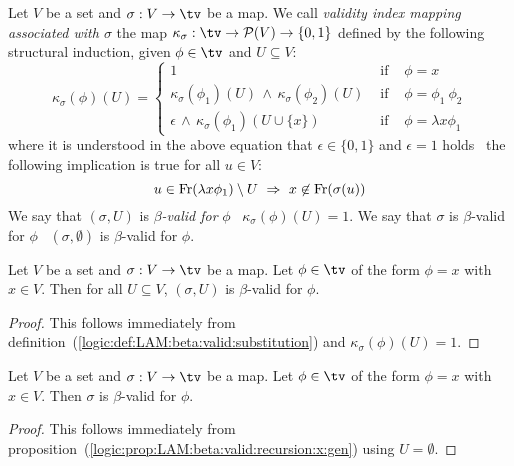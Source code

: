 \begin{defin}\label{logic:def:LAM:beta:valid:substitution}
    Let $V$ be a set and $\sigma:V\to\tv$ be a map. We call {\em validity
    index mapping associated with $\sigma$} the map $\kappa_{\sigma}:\tv
    \to{\cal P}(V)\to\{0,1\}$ defined by the following structural induction,
    given $\phi\in\tv$ and $U\subseteq V$:
        \begin{equation}\label{logic:eqn:LAM:index}
            \kappa_{\sigma}(\phi)(U)=\left\{
                \begin{array}{lcl}
                    1&\mbox{\ if\ }&\phi=x\\
                    \kappa_{\sigma}(\phi_{1})(U)\,\land\,
                    \kappa_{\sigma}(\phi_{2})(U)
                    &\mbox{\ if\ }&\phi=\phi_{1}\ \phi_{2}\\
                    \epsilon\,\land\,\kappa_{\sigma}(\phi_{1})(U\cup\{x\})
                    &\mbox{\ if\ }&\phi=\lambda x\phi_{1}
            \end{array}\right.
        \end{equation} 
    where it is understood in the above equation that $\epsilon\in\{0,1\}$ 
    and $\epsilon=1$ holds \ifand\ the following implication is true 
    for all $u\in V$:
        \[
            u\in\free(\lambda x\phi_{1})\setminus U
                \ \Rightarrow\ 
            x\not\in\free(\sigma(u))
        \]
    We say that $(\sigma,U)$ is {\em $\beta$-valid for} $\phi$ \ifand\ 
    $\kappa_{\sigma}(\phi)(U)=1$. \newline
    We say that $\sigma$ is $\beta$-valid for $\phi$ \ifand\
    $(\sigma,\emptyset)$ is $\beta$-valid for $\phi$.
\end{defin}

\begin{prop}\label{logic:prop:LAM:beta:valid:recursion:x:gen}
    Let $V$ be a set and $\sigma:V\to\tv$ be a map. Let $\phi\in\tv$
    of the form $\phi=x$ with $x\in V$. Then for all $U\subseteq V$, 
    $(\sigma,U)$ is $\beta$-valid for $\phi$.
\end{prop}
\begin{proof}
    This follows immediately from 
    definition~(\ref{logic:def:LAM:beta:valid:substitution}) and $\kappa_{
        \sigma}(\phi)(U)=1$.
\end{proof}
\begin{prop}\label{logic:prop:LAM:beta:valid:recursion:x}
    Let $V$ be a set and $\sigma:V\to\tv$ be a map. Let $\phi\in\tv$
    of the form $\phi=x$ with $x\in V$. Then 
    $\sigma$ is $\beta$-valid for $\phi$.
\end{prop}
\begin{proof}
    This follows immediately from 
    proposition~(\ref{logic:prop:LAM:beta:valid:recursion:x:gen}) using 
    $U=\emptyset$.
\end{proof}

